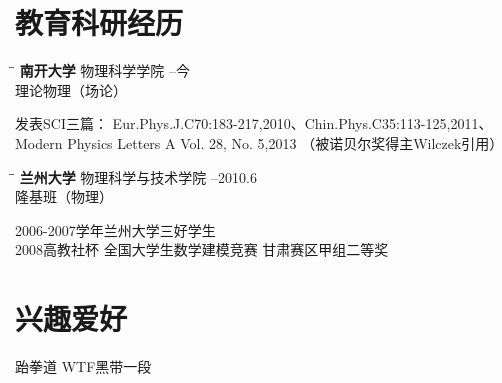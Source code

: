 \documentclass{res}
\begin{document}
\begin{CJK}{UTF8}{gbsn}
\begin{resume}
\section{教育科研经历}
   \vspace{-0.1in}	
   \begin{tabbing}
   \hspace{2.3in}\= \hspace{2.6in}\= \kill %
    {\bf 南开大学} \>物理科学学院     --今\\
                             \>理论物理（场论）
   \end{tabbing}\vspace{-20pt}      %
    发表SCI三篇：
    Eur.Phys.J.C70:183-217,2010、Chin.Phys.C35:113-125,2011、Modern Physics Letters A Vol. 28, No. 5,2013
    （被诺贝尔奖得主Wilczek引用）
    \vspace{-0.1in}
   \begin{tabbing}
   \hspace{2.3in}\= \hspace{2.6in}\= \kill %
    {\bf 兰州大学} \>物理科学与技术学院 --2010.6\\
                          \>隆基班（物理）
   \end{tabbing}\vspace{-20pt}
    2006-2007学年兰州大学三好学生\\
    2008高教社杯 全国大学生数学建模竞赛 甘肃赛区甲组二等奖
      
\section{兴趣爱好}          
    跆拳道 WTF黑带一段\\
 
\end{resume}
\end{CJK}
\end{document}
